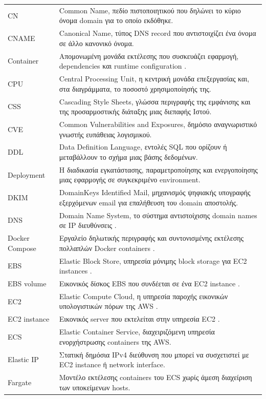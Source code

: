 \documentclass[12pt,a4paper,twoside,fleqn]{book}
\begin{document}
\begin{longtable}{@{}p{3.8cm}p{9.2cm}@{}}
CN & Common Name, πεδίο πιστοποιητικού που δηλώνει το κύριο όνομα domain για το οποίο εκδόθηκε.\\
CNAME & Canonical Name, τύπος DNS record που αντιστοιχίζει ένα όνομα σε άλλο κανονικό όνομα.\\
Container & Απομονωμένη μονάδα εκτέλεσης που συσκευάζει εφαρμογή, dependencies και runtime configuration \cite{docker2026containers}.\\
CPU & Central Processing Unit, η κεντρική μονάδα επεξεργασίας και, στα διαγράμματα, το ποσοστό χρησιμοποίησής της.\\
CSS & Cascading Style Sheets, γλώσσα περιγραφής της εμφάνισης και της προσαρμοστικής διάταξης μιας διεπαφής Ιστού.\\
CVE & Common Vulnerabilities and Exposures, δημόσιο αναγνωριστικό γνωστής ευπάθειας λογισμικού.\\
DDL & Data Definition Language, εντολές SQL που ορίζουν ή μεταβάλλουν το σχήμα μιας βάσης δεδομένων.\\
Deployment & Η διαδικασία εγκατάστασης, παραμετροποίησης και ενεργοποίησης μιας εφαρμογής σε συγκεκριμένο environment.\\
DKIM & DomainKeys Identified Mail, μηχανισμός ψηφιακής υπογραφής εξερχόμενων email για επαλήθευση του domain αποστολής.\\
DNS & Domain Name System, το σύστημα αντιστοίχισης domain names σε IP διευθύνσεις \cite{rfc1034}.\\
Docker Compose & Εργαλείο δηλωτικής περιγραφής και συντονισμένης εκτέλεσης πολλαπλών Docker containers \cite{docker2026compose}.\\
EBS & Elastic Block Store, υπηρεσία μόνιμης block storage για EC2 instances \cite{aws2026ebs}.\\
EBS volume & Εικονικός δίσκος EBS που συνδέεται σε ένα EC2 instance \cite{aws2026ebs}.\\
EC2 & Elastic Compute Cloud, η υπηρεσία παροχής εικονικών υπολογιστικών πόρων της AWS \cite{aws2026ec2}.\\
EC2 instance & Εικονικός server που εκτελείται στην υπηρεσία EC2 \cite{aws2026ec2}.\\
ECS & Elastic Container Service, διαχειριζόμενη υπηρεσία ενορχήστρωσης containers της AWS.\\
Elastic IP & Στατική δημόσια IPv4 διεύθυνση που μπορεί να συσχετιστεί με EC2 instance ή network interface.\\
Fargate & Μοντέλο εκτέλεσης containers του ECS χωρίς άμεση διαχείριση των υποκείμενων hosts.\\

\end{longtable}
\end{document}
